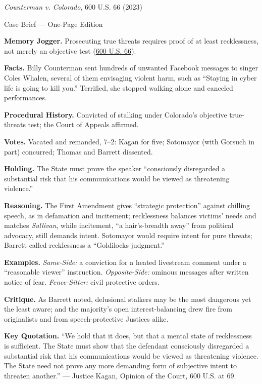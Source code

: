 \documentclass[12pt]{article}
\begin{document}
\begin{center}
{\Large \textit{Counterman v. Colorado}, 600 U.S. 66 (2023)\par}
\vspace{0.3em}
{\normalsize Case Brief --- One-Page Edition\par}
\end{center}

\textbf{Memory Jogger.} Prosecuting true threats requires proof of at least recklessness, not merely an objective test (\href{https://supreme.justia.com/cases/federal/us/600/22-138/}{600 U.S. 66}).

\textbf{Facts.} Billy Counterman sent hundreds of unwanted Facebook messages to singer Coles Whalen, several of them envisaging violent harm, such as ``Staying in cyber life is going to kill you.'' Terrified, she stopped walking alone and canceled performances.

\textbf{Procedural History.} Convicted of stalking under Colorado's objective true-threats test; the Court of Appeals affirmed.

\textbf{Votes.} Vacated and remanded, 7--2: Kagan for five; Sotomayor (with Gorsuch in part) concurred; Thomas and Barrett dissented.

\textbf{Holding.} The State must prove the speaker ``consciously disregarded a substantial risk that his communications would be viewed as threatening violence.''

\textbf{Reasoning.} The First Amendment gives ``strategic protection'' against chilling speech, as in defamation and incitement; recklessness balances victims' needs and matches \textit{Sullivan}, while incitement, ``a hair's-breadth away'' from political advocacy, still demands intent. Sotomayor would require intent for pure threats; Barrett called recklessness a ``Goldilocks judgment.''

\textbf{Examples.} \emph{Same-Side:} a conviction for a heated livestream comment under a ``reasonable viewer'' instruction. \emph{Opposite-Side:} ominous messages after written notice of fear. \emph{Fence-Sitter:} civil protective orders.

\textbf{Critique.} As Barrett noted, delusional stalkers may be the most dangerous yet the least aware; and the majority's open interest-balancing drew fire from originalists and from speech-protective Justices alike.

\textbf{Key Quotation.} ``We hold that it does, but that a mental state of recklessness is sufficient. The State must show that the defendant consciously disregarded a substantial risk that his communications would be viewed as threatening violence. The State need not prove any more demanding form of subjective intent to threaten another.'' --- Justice Kagan, Opinion of the Court, 600 U.S. at 69.
\end{document}
